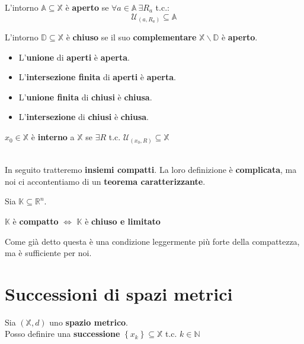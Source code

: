 \documentclass[a4paper, oneside]{article}
\newcommand\X{\mathbb{X}}
\newcommand\R{\mathbb{R}}
\newcommand\A{\mathbb{A}}
\newcommand\D{\mathbb{D}}
\newcommand\K{\mathbb{K}}
\begin{document}
\begin{definition}
    L'intorno $\A\subseteq\X$ è \textbf{aperto} se $\forall a\in\A \ \exists R_a$ t.c.:
    \[\mathcal{U}_{(a,R_a)} \subseteq \A\]
\end{definition}

\begin{definition}
    L'intorno $\D\subseteq\X$ è \textbf{chiuso} se il suo \textbf{complementare} $\X\backslash\D$ è \textbf{aperto}.
\end{definition}

\begin{observation}\noindent
    \begin{itemize}
        \item L'\textbf{unione} di \textbf{aperti} è \textbf{aperta}.
        \item L'\textbf{intersezione finita} di \textbf{aperti} è \textbf{aperta}.
        \item L'\textbf{unione finita} di \textbf{chiusi} è \textbf{chiusa}.
        \item L'\textbf{intersezione} di \textbf{chiusi} è \textbf{chiusa}.
    \end{itemize}
\end{observation}

\begin{definition}
    $x_0\in\X$ è \textbf{interno} a $\X$ se $\exists R$ t.c. $\mathcal{U}_{(x_0,R)}\subseteq\X$
\end{definition}
\hfill\\
\noindent
In seguito tratteremo \textbf{insiemi compatti}. La loro definizione è \textbf{complicata}, ma noi ci accontentiamo 
di un \textbf{teorema caratterizzante}. 

\begin{theorem}
    Sia $\K\subseteq\R^n$. 
    \begin{center}
        $\K$ è \textbf{compatto} $\Longleftrightarrow$ $\K$ è \textbf{chiuso e limitato}
    \end{center}
\end{theorem}
\noindent
Come già detto questa è una condizione leggermente più forte della compattezza, ma è sufficiente per noi.\\
\newpage

\section{Successioni di spazi metrici}
Sia $(\X,d)$ uno \textbf{spazio metrico}. \\
Posso definire una \textbf{successione} $\left\{x_k\right\}\subseteq\X$ t.c. $k \in \mathbb{N}$
\end{document}

